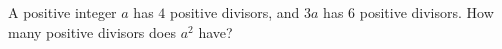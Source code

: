 A positive integer $a$ has $4$ positive divisors, and $3a$ has $6$ positive divisors. How many positive divisors does $a^2$ have?
